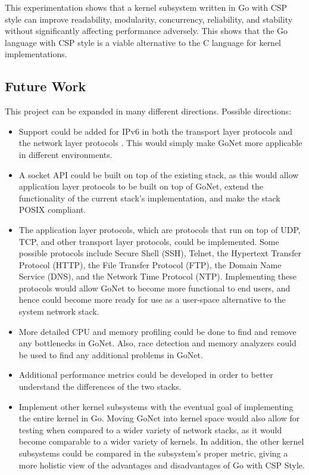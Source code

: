 \documentclass[twocolumn,10pt]{article}
\begin{document}
This experimentation shows that a kernel subsystem written in Go with CSP style can improve readability, modularity, concurrency, reliability, and stability without significantly affecting performance adversely. This shows that the Go language with CSP style is a viable alternative to the C language for kernel implementations. 

\subsection{Future Work}
This project can be expanded in many different directions. Possible directions:
\begin{itemize}
\item Support could be added for IPv6 in both the transport layer protocols and the network layer protocols \cite{OSIRREFRFC}. This would simply make GoNet more applicable in different environments. 
\item A socket API could be built on top of the existing stack, as this would allow application layer protocols to be built on top of GoNet, extend the functionality of the current stack's implementation, and make the stack POSIX compliant. 
\item The application layer protocols, which are protocols that run on top of UDP, TCP, and other transport layer protocols, could be implemented. Some possible protocols include Secure Shell (SSH), Telnet, the Hypertext Transfer Protocol (HTTP), the File Transfer Protocol (FTP), the Domain Name Service (DNS), and the Network Time Protocol (NTP). Implementing these protocols would allow GoNet to become more functional to end users, and hence could become more ready for use as a user-space alternative to the system network stack. 
\item More detailed CPU and memory profiling could be done to find and remove any bottlenecks in GoNet. Also, race detection and memory analyzers could be used to find any additional problems in GoNet.

\item Additional performance metrics could be developed in order to better understand the differences of the two stacks.

\item Implement other kernel subsystems with the eventual goal of implementing the entire kernel in Go. Moving GoNet into kernel space would also allow for testing when compared to a wider variety of network stacks, as it would become comparable to a wider variety of kernels. In addition, the other kernel subsystems could be compared in the subsystem's proper metric, giving a more holistic view of the advantages and disadvantages of Go with CSP Style. 
\end{itemize}

\printbibliography
\end{document}
